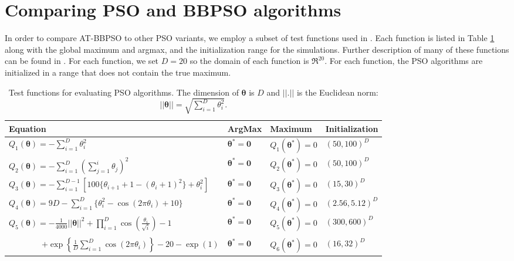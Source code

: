 \documentclass[12pt]{article}
\begin{document}
\section{Comparing PSO and BBPSO algorithms}\label{app:psocompare}
In order to compare AT-BBPSO to other PSO variants, we employ a subset of test functions used in \citet{hsieh2010modified}. Each function is listed in Table \ref{tab:testfuns} along with the global maximum and argmax, and the initialization range for the simulations. Further description of many of these functions can be found in \citet{clerc2010particle}. For each function, we set $D=20$ so the domain of each function is $\Re^{20}$. For each function, the PSO algorithms are initialized in a range that does not contain the true maximum.

\begin{table}[h]
\centering
\begin{tabular}{llll}
 Equation & ArgMax & Maximum & Initialization \\\hline
 $Q_1(\bm{\theta}) = -\sum_{i=1}^D\theta_i^2$ & $\bm{\theta}^* = \bm{0}$ & $Q_1(\bm{\theta}^*) = 0$  & $(50, 100)^D$ \\
 $Q_2(\bm{\theta}) = -\sum_{i=1}^D\left(\sum_{j=1}^i \theta_j\right)^2 $ & $\bm{\theta}^* = \bm{0}$ & $Q_2(\bm{\theta}^*) = 0$ & $(50, 100)^D$ \\
 $Q_3(\bm{\theta}) = -\sum_{i=1}^{D-1}\left[100\{\theta_{i+1} + 1 - (\theta_i + 1)^2\} + \theta_i^2\right]$ & $\bm{\theta}^* = \bm{0}$ & $Q_3(\bm{\theta}^*) = 0$ & $(15, 30)^D$ \\
 $Q_4(\bm{\theta}) = 9D - \sum_{i=1}^D\{\theta_i^2 - \cos(2\pi \theta_i) + 10\}$ & $\bm{\theta}^*=\bm{0}$ & $Q_4(\bm{\theta}^*) = 0$ & $(2.56, 5.12)^D$ \\
 $Q_5(\bm{\theta}) = -\frac{1}{4000}||\bm{\theta}||^2 + \prod_{i=1}^D\cos\left(\frac{\theta_i}{\sqrt{i}}\right) - 1$ & $\bm{\theta}^* = \bm{0}$ & $Q_5(\bm{\theta}^*) = 0$ & $(300, 600)^D$ \\
 \shortstack[l]{$Q_6(\bm{\theta}) = 20\exp\left(-0.2\sqrt{\frac{1}{D}||\bm{\theta}||}\right)$ \\ \ \ \ \ \ \ \ \ $+ \exp\left\{\frac{1}{D}\sum_{i=1}^D\cos(2\pi \theta_i)\right\} - 20 - \exp(1)$} & $\bm{\theta}^* = \bm{0}$ & $Q_6(\bm{\theta}^*) = 0$ & $(16, 32)^D$\\\hline
\end{tabular}
\caption{Test functions for evaluating PSO algorithms. The dimension of $\bm{\theta}$ is $D$ and $||.||$ is the Euclidean norm: $||\bm{\theta}|| = \sqrt{\sum_{i=1}^D\theta_i^2}$.} 
\label{tab:testfuns}
\end{table}
\end{document}
